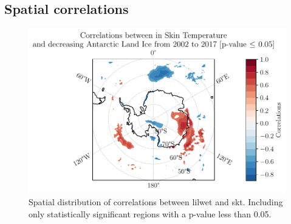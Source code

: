\documentclass[../main.tex]{subfiles}
\begin{document}
\subsection{Spatial correlations}
\begin{figure}[hbt!]
    \centering
    \includegraphics{images/2021w5/chapter7/hres/decreasing_correlation_spatial_skt}
    \caption{Spatial distribution of correlations between \gls{lilwet} and \gls{skt}. Including only statistically significant regions with a p-value less than 0.05.}
    \label{fig:correlation_spatial_skt}
\end{figure}
\end{document}

